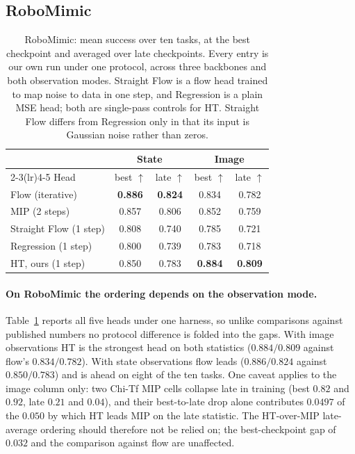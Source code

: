 \subsection{RoboMimic}
\label{sec:exp:robomimic}

\begin{table}[t]
\centering
\caption{RoboMimic: mean success over ten tasks, at the best checkpoint and
averaged over late checkpoints. Every entry is our own run under one protocol, across three backbones
and both observation modes. Straight Flow is a flow head trained to map noise to
data in one step, and Regression is a plain MSE head; both are single-pass
controls for HT. Straight Flow differs from Regression only in that its input
is Gaussian noise rather than zeros.}
\label{tab:robomimic}
\begin{tabular}{lcccc}
\toprule
& \multicolumn{2}{c}{State} & \multicolumn{2}{c}{Image} \\
\cmidrule(lr){2-3}\cmidrule(lr){4-5}
Head & best $\uparrow$ & late $\uparrow$ & best $\uparrow$ & late $\uparrow$ \\
\midrule
Flow (iterative)     & \textbf{0.886} & \textbf{0.824} & 0.834 & 0.782 \\
MIP (2 steps)        & 0.857 & 0.806 & 0.852 & 0.759 \\
Straight Flow (1 step)& 0.808 & 0.740 & 0.785 & 0.721 \\
Regression (1 step)  & 0.800 & 0.739 & 0.783 & 0.718 \\
HT, ours (1 step)    & 0.850 & 0.783 & \textbf{0.884} & \textbf{0.809} \\
\bottomrule
\end{tabular}
\end{table}

\paragraph{On RoboMimic the ordering depends on the observation mode.}
Table~\ref{tab:robomimic} reports all five heads under one harness, so unlike
comparisons against published numbers no protocol difference is folded into the
gaps. With image observations HT is the strongest head on both statistics
($0.884/0.809$ against flow's $0.834/0.782$). With state observations flow
leads ($0.886/0.824$ against $0.850/0.783$) and is ahead on eight of the ten
tasks. One caveat applies to the image column only: two Chi-Tf MIP cells
collapse late in training (best $0.82$ and $0.92$, late $0.21$ and $0.04$), and
their best-to-late drop alone contributes $0.0497$ of the $0.050$ by which HT
leads MIP on the late statistic. The HT-over-MIP late-average ordering should
therefore not be relied on; the best-checkpoint gap of $0.032$ and the
comparison against flow are unaffected.

